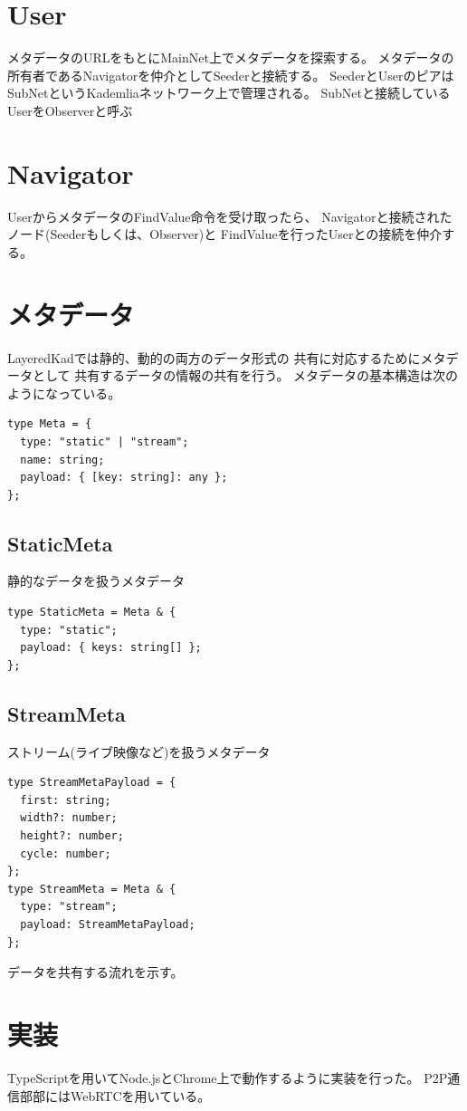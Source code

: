 \documentclass[sotsuron]{jcsie}
\begin{document}
\section{User}
メタデータのURLをもとにMainNet上でメタデータを探索する。
メタデータの所有者であるNavigatorを仲介としてSeederと接続する。
SeederとUserのピアはSubNetというKademliaネットワーク上で管理される。
SubNetと接続しているUserをObserverと呼ぶ
\section{Navigator}
UserからメタデータのFindValue命令を受け取ったら、
Navigatorと接続されたノード(Seederもしくは、Observer)と
FindValueを行ったUserとの接続を仲介する。

\section{メタデータ}
LayeredKadでは静的、動的の両方のデータ形式の
共有に対応するためにメタデータとして
共有するデータの情報の共有を行う。
メタデータの基本構造は次のようになっている。
\begin{lstlisting}
type Meta = {
  type: "static" | "stream";
  name: string;
  payload: { [key: string]: any };
};
\end{lstlisting}
\subsection{StaticMeta}
静的なデータを扱うメタデータ
\begin{lstlisting}
type StaticMeta = Meta & {
  type: "static";
  payload: { keys: string[] };
};
\end{lstlisting}
\subsection{StreamMeta}
ストリーム(ライブ映像など)を扱うメタデータ
\begin{lstlisting}
type StreamMetaPayload = {
  first: string;
  width?: number;
  height?: number;
  cycle: number;
};	
type StreamMeta = Meta & {
  type: "stream";
  payload: StreamMetaPayload;
};  
\end{lstlisting}

データを共有する流れを示す。

\section{実装}
TypeScriptを用いてNode.jsとChrome上で動作するように実装を行った。
P2P通信部部にはWebRTCを用いている。
\end{document}
